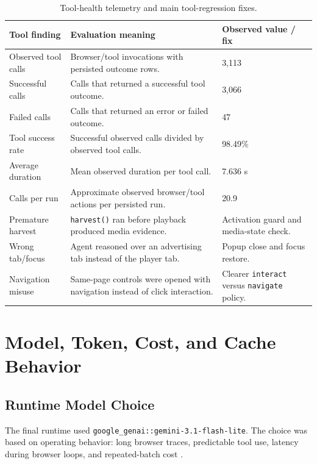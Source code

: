 \begin{table}[!htbp]
\centering
\begin{tabularx}{\textwidth}{Q{3.6cm}Y Z{3.0cm}}
\toprule
{}
Tool finding & Evaluation meaning & Observed value / fix \\
\midrule
Observed tool calls & Browser/tool invocations with persisted outcome rows. &
3,113 \\
Successful calls & Calls that returned a successful tool outcome. & 3,066 \\
Failed calls & Calls that returned an error or failed outcome. & 47 \\
Tool success rate & Successful observed calls divided by observed tool calls. &
98.49\% \\
Average duration & Mean observed duration per tool call. & 7.636 s \\
Calls per run & Approximate observed browser/tool actions per persisted run. &
20.9 \\
Premature harvest & \texttt{harvest()} ran before playback produced media
evidence. & Activation guard and media-state check. \\
Wrong tab/focus & Agent reasoned over an advertising tab instead of the player
tab. & Popup close and focus restore. \\
Navigation misuse & Same-page controls were opened with navigation instead of
click interaction. & Clearer \texttt{interact} versus \texttt{navigate}
policy. \\
\bottomrule
\end{tabularx}
\caption{Tool-health telemetry and main tool-regression fixes.}
\label{tab:tool-regression-summary}
\end{table}

\section{Model, Token, Cost, and Cache Behavior}

\subsection{Runtime Model Choice}

The final runtime used \texttt{google\_genai::gemini-3.1-flash-lite}. The
choice was based on operating behavior: long browser traces, predictable tool
use, latency during browser loops, and repeated-batch cost
\cite{gemini-pricing,gemini-caching,gemini-rate-limits,openrouter-models}.

